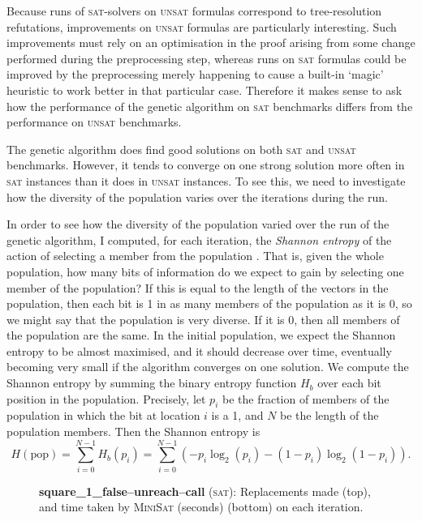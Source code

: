 \documentclass[proof,pdftex,11pt,a4,titlepage]{article}
\newcommand{\sat}{\textsc{sat}}
\newcommand{\unsat}{\textsc{unsat}}
\begin{document}
Because runs of \sat{}-solvers on \unsat{} formulas correspond to tree-resolution refutations, improvements on \unsat{} formulas are particularly interesting. Such improvements must rely on an optimisation in the proof arising from some change performed during the preprocessing step, whereas runs on \sat{} formulas could be improved by the preprocessing merely happening to cause a built-in `magic' heuristic to work better in that particular case. Therefore it makes sense to ask how the performance of the genetic algorithm on \sat{} benchmarks differs from the performance on \unsat{} benchmarks.

The genetic algorithm does find good solutions on both \sat{} and \unsat{} benchmarks. However, it tends to converge on one strong solution more often in \sat{} instances than it does in \unsat{} instances. To see this, we need to investigate how the diversity of the population varies over the iterations during the run.

In order to see how the diversity of the population varied over the run of the genetic algorithm, I computed, for each iteration, the \emph{Shannon entropy} of the action of selecting a member from the population \cite{Shannon:1948}. That is, given the whole population, how many bits of information do we expect to gain by selecting one member of the population? If this is equal to the length of the vectors in the population, then each bit is 1 in as many members of the population as it is 0, so we might say that the population is very diverse. If it is 0, then all members of the population are the same. In the initial population, we expect the Shannon entropy to be almost maximised, and it should decrease over time, eventually becoming very small if the algorithm converges on one solution. We compute the Shannon entropy by summing the binary entropy function $H_b$ over each bit position in the population. Precisely, let $p_i$ be the fraction of members of the population in which the bit at location $i$ is a 1, and $N$ be the length of the population members. Then the Shannon entropy is
\[H(\mathrm{pop}) = \sum_{i=0}^{N-1} H_b(p_i) = \sum_{i=0}^{N-1} \left( -p_i\log_2(p_i) - (1-p_i)\log_2(1-p_i) \right).\]

\begin{figure}[p]
  

  \vspace{1cm}

  
  \caption{{\bf square\_1\_false--unreach--call} (\sat{}): Replacements made (top), and time taken by \textsc{MiniSat} (seconds) (bottom) on each iteration.}
  \label{fig:square_1_rep_dist}
\end{figure}
\end{document}
